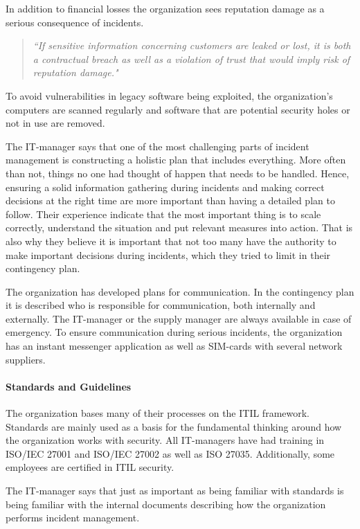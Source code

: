 In addition to financial losses the organization sees reputation damage as a serious consequence of incidents. 
\begin{quote}
\textit{``If sensitive information concerning customers are leaked or lost, it is both a contractual breach as well as a violation of trust that would imply risk of reputation damage."}
\end{quote}

To avoid vulnerabilities in legacy software being exploited, the organization's computers are scanned regularly and software that are potential security holes or not in use are removed. 

The IT-manager says that one of the most challenging parts of incident management is constructing a holistic plan that includes everything. More often than not, things no one had thought of happen that needs to be handled. Hence, ensuring a solid information gathering during incidents and making correct decisions at the right time are more important than having a detailed plan to follow. Their experience indicate that the most important thing is to scale correctly, understand the situation and put relevant measures into action. That is also why they believe it is important that not too many have the authority to make important decisions during incidents, which they tried to limit in their contingency plan.

The organization has developed plans for communication. In the contingency plan it is described who is responsible for communication, both internally and externally. The IT-manager or the supply manager are always available in case of emergency. To ensure communication during serious incidents, the organization has an instant messenger application as well as SIM-cards with several network suppliers. 

\paragraph{Standards and Guidelines}
The organization bases many of their processes on the ITIL framework. Standards are mainly used as a basis for the fundamental thinking around how the organization works with security. All IT-managers have had training in ISO/IEC 27001 and ISO/IEC 27002 as well as ISO 27035. Additionally, some employees are certified in ITIL security.   

The IT-manager says that just as important as being familiar with standards is being familiar with the internal documents describing how the organization performs incident management. 

